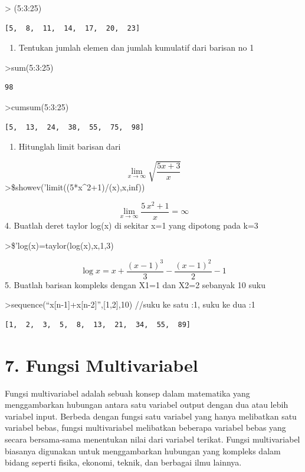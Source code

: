 \documentclass[
]{book}
\providecommand{\tightlist}{%
  \setlength{\itemsep}{0pt}\setlength{\parskip}{0pt}}
\begin{document}
\textgreater{} (5:3:25)

\begin{verbatim}
[5,  8,  11,  14,  17,  20,  23]
\end{verbatim}

\begin{enumerate}
\def\labelenumi{\arabic{enumi}.}
\setcounter{enumi}{1}
\tightlist
\item
  Tentukan jumlah elemen dan jumlah kumulatif dari barisan no 1
\end{enumerate}

\textgreater sum(5:3:25)

\begin{verbatim}
98
\end{verbatim}

\textgreater cumsum(5:3:25)

\begin{verbatim}
[5,  13,  24,  38,  55,  75,  98]
\end{verbatim}

\begin{enumerate}
\def\labelenumi{\arabic{enumi}.}
\setcounter{enumi}{2}
\tightlist
\item
  Hitunglah limit barisan dari
\end{enumerate}

\[\lim_{x\to\infty}\sqrt{\frac{5x+3}{x}}\]\textgreater\$showev('limit((5*x\^{}2+1)/(x),x,inf))

\[\lim_{x\rightarrow \infty }{\frac{5\,x^2+1}{x}}=\infty \]4. Buatlah deret taylor log(x) di sekitar x=1 yang dipotong pada k=3

\textgreater\$'log(x)=taylor(log(x),x,1,3)

\[\log x=x+\frac{\left(x-1\right)^3}{3}-\frac{\left(x-1\right)^2}{2}-  1\]5. Buatlah barisan kompleks dengan X1=1 dan X2=2 sebanyak 10 suku

\textgreater sequence(``x{[}n-1{]}+x{[}n-2{]}'',{[}1,2{]},10) //suku ke satu :1, suku ke dua :1

\begin{verbatim}
[1,  2,  3,  5,  8,  13,  21,  34,  55,  89]
\end{verbatim}

\chapter{7. Fungsi Multivariabel}\label{fungsi-multivariabel}

Fungsi multivariabel adalah sebuah konsep dalam matematika yang menggambarkan hubungan antara satu variabel output dengan dua atau lebih variabel input. Berbeda dengan fungsi satu variabel yang hanya melibatkan satu variabel bebas, fungsi multivariabel melibatkan beberapa variabel bebas yang secara bersama-sama menentukan nilai dari variabel terikat. Fungsi multivariabel biasanya digunakan untuk menggambarkan hubungan yang kompleks dalam bidang seperti fisika, ekonomi, teknik, dan berbagai ilmu lainnya.
\end{document}
